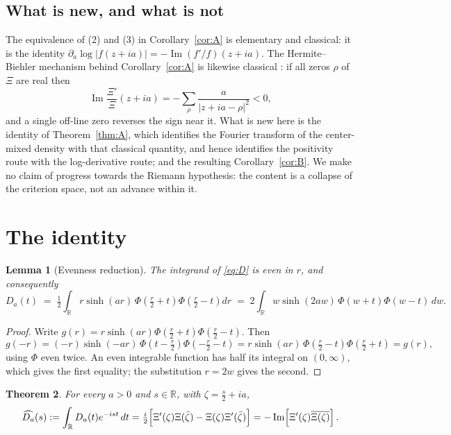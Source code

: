 \documentclass[11pt,a4paper]{amsart}
\theoremstyle{plain}
\newtheorem{theorem}{Theorem}[section]
\newtheorem{lemma}[theorem]{Lemma}
\theoremstyle{definition}
\newcommand{\RR}{\mathbb{R}}
\newcommand{\Xii}{\Xi}
\begin{document}
\subsection{What is new, and what is not}
The equivalence of (2) and (3) in Corollary~\ref{cor:A} is elementary and classical: it is the
identity $\partial_a\log|f(z+ia)|=-\operatorname{Im}(f'/f)(z+ia)$. The Hermite--Biehler mechanism
behind Corollary~\ref{cor:A} is likewise classical \cite{Levin}: if all zeros $\rho$ of $\Xii$ are
real then
\begin{equation}\label{eq:HB}
  \operatorname{Im}\frac{\Xii'}{\Xii}(z+ia)=-\sum_\rho\frac{a}{|z+ia-\rho|^2}<0 ,
\end{equation}
and a single off-line zero reverses the sign near it. What is new here is the identity of
Theorem~\ref{thm:A}, which identifies the Fourier transform of the center-mixed density with that
classical quantity, and hence identifies the positivity route with the log-derivative route; and the
resulting Corollary~\ref{cor:B}. We make no claim of progress towards the Riemann hypothesis: the
content is a collapse of the criterion space, not an advance within it.

\section{The identity}\label{sec:main}

\begin{lemma}[Evenness reduction]\label{lem:even}
The integrand of \eqref{eq:D} is even in $r$, and consequently
\[
  D_a(t)\;=\;\tfrac12\int_\RR r\sinh(ar)\,\Phi\!\left(\tfrac r2+t\right)\Phi\!\left(\tfrac r2-t\right)dr
  \;=\;2\int_\RR w\sinh(2aw)\,\Phi(w+t)\Phi(w-t)\,dw .
\]
\end{lemma}

\begin{proof}
Write $g(r)=r\sinh(ar)\Phi(\tfrac r2+t)\Phi(\tfrac r2-t)$. Then
\[
  g(-r)=(-r)\sinh(-ar)\,\Phi\!\left(t-\tfrac r2\right)\Phi\!\left(-\tfrac r2-t\right)
       =r\sinh(ar)\,\Phi\!\left(\tfrac r2-t\right)\Phi\!\left(\tfrac r2+t\right)=g(r),
\]
using $\Phi$ even twice. An even integrable function has half its integral on $(0,\infty)$, which
gives the first equality; the substitution $r=2w$ gives the second.
\end{proof}

\begin{theorem}\label{thm:main}
For every $a>0$ and $s\in\RR$, with $\zeta=\tfrac s2+ia$,
\[
  \widehat{D_a}(s):=\int_\RR D_a(t)e^{-ist}\,dt
   =\tfrac i2\Bigl[\Xii'(\zeta)\Xii(\bar\zeta)-\Xii(\zeta)\Xii'(\bar\zeta)\Bigr]
   =-\operatorname{Im}\!\left[\Xii'(\zeta)\overline{\Xii(\zeta)}\right].
\]
\end{theorem}
\end{document}
